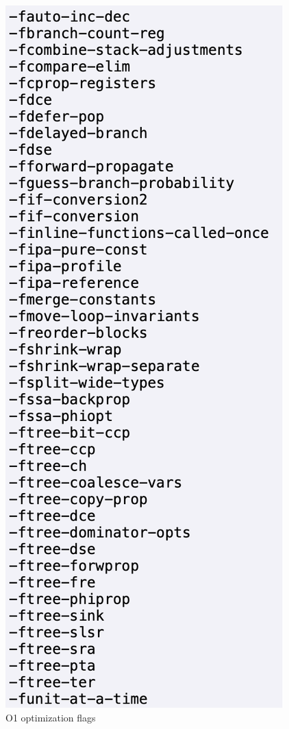 \documentclass[conference]{IEEEtran}
\begin{document}
\begin{figure}[htbp]
\centering
\includegraphics [width=0.4\linewidth]{pictures/o1.png}
\caption{O1 optimization flags\cite{b2}}
\label{fig}
\end{figure}
\end{document}
